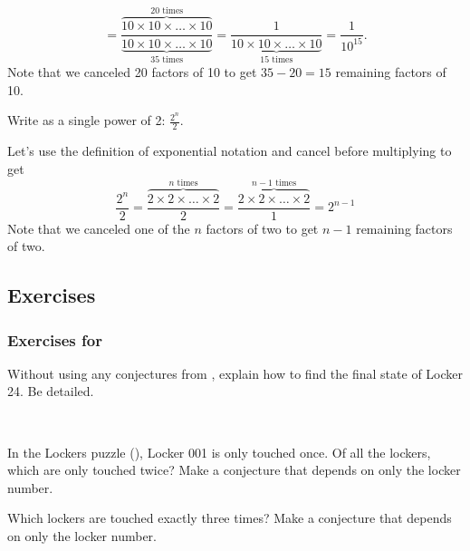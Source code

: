 \begin{exam}
\begin{apart}
\begin{soln}
$$                    = \frac{\overbrace{10 \times 10 \times \ldots \times 10}^{20 \text{ times}}}{\underbrace{10 \times 10 \times \ldots \times 10}_{35 \text{ times}}}
                    = \frac{1}{\underbrace{10 \times 10 \times \ldots \times 10}_{15 \text{ times}}} 
                    = \frac{1}{10^{15}}.
                    $$
                Note that we canceled 20 factors of 10 to get $35-20=15$ remaining factors of 10.
            \end{soln}
        \item Write as a single power of 2:
        $\displaystyle\frac{2^n}{2}.$
            \begin{soln}
                Let's use the definition of exponential notation and cancel before multiplying to get
                    $$\frac{2^n}{2}
                    = \frac{\overbrace{2 \times 2 \times \ldots \times 2}^{n \text{ times}}}{2}
                    = \frac{\overbrace{2 \times 2 \times \ldots \times 2}^{n-1 \text{ times}}}{1}
                    = 2^{n-1}
                    $$
                Note that we canceled one of the $n$ factors of two to get $n-1$ remaining factors of two.
            \end{soln}
    \end{apart}
\end{exam}


\subsection{Exercises}


\subsubsection{Exercises for  \sublockers}

\begin{exer}[\exerP] %
\label{exer_locker24}  
Without using any conjectures from , explain how to find the final state of Locker 24.  Be detailed.
\end{exer}

\begin{exer}[\exerU] %
\label{exer_lockers_2or3}
~
    \begin{exerpart}
        \item In the Lockers puzzle (), Locker 001 is only touched once.  Of all the lockers, which are only touched twice? Make a conjecture that depends on only the locker number.
        \item Which lockers are touched exactly three times? Make a conjecture that depends on only the locker number.    
    \end{exerpart}  
\end{exer}

